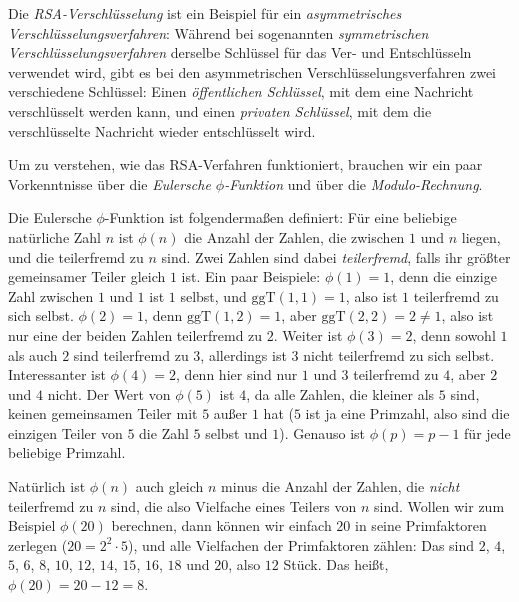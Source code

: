\documentclass{zusammenfassung}
\begin{document}

Die \emph{RSA-Verschlüsselung} ist ein Beispiel für ein \emph{asymmetrisches Verschlüsselungsverfahren}: Während bei sogenannten
\emph{symmetrischen Verschlüsselungsverfahren} derselbe Schlüssel für das Ver- und Entschlüsseln verwendet wird, gibt es bei den
asymmetrischen Verschlüsselungsverfahren zwei verschiedene Schlüssel: Einen \emph{öffentlichen Schlüssel}, mit dem eine Nachricht
verschlüsselt werden kann, und einen \emph{privaten Schlüssel}, mit dem die verschlüsselte Nachricht wieder entschlüsselt wird.

Um zu verstehen, wie das RSA-Verfahren funktioniert, brauchen wir ein paar Vorkenntnisse über die \emph{Eulersche $\phi$-Funktion}
und über die \emph{Modulo-Rechnung}.

Die Eulersche $\phi$-Funktion ist folgendermaßen definiert: Für eine beliebige natürliche Zahl $n$ ist $\phi(n)$ die Anzahl der
Zahlen, die zwischen $1$ und $n$ liegen, und die teilerfremd zu $n$ sind. Zwei Zahlen sind dabei \emph{teilerfremd}, falls ihr
größter gemeinsamer Teiler gleich $1$ ist. Ein paar Beispiele: $\phi(1)=1$, denn die einzige Zahl zwischen $1$ und $1$ ist $1$
selbst, und $\text{ggT}(1,1)=1$, also ist $1$ teilerfremd zu sich selbst. $\phi(2)=1$, denn $\text{ggT}(1,2)=1$, aber
$\text{ggT}(2,2)=2\neq 1$, also ist nur eine der beiden Zahlen teilerfremd zu $2$. Weiter ist $\phi(3)=2$, denn sowohl $1$ als
auch $2$ sind teilerfremd zu $3$, allerdings ist $3$ nicht teilerfremd zu sich selbst. Interessanter ist $\phi(4)=2$, denn hier
sind nur $1$ und $3$ teilerfremd zu $4$, aber $2$ und $4$ nicht. Der Wert von $\phi(5)$ ist $4$, da alle Zahlen, die kleiner als
$5$ sind, keinen gemeinsamen Teiler mit $5$ außer $1$ hat ($5$ ist ja eine Primzahl, also sind die einzigen Teiler von $5$ die
Zahl $5$ selbst und $1$). Genauso ist $\phi(p)=p-1$ für jede beliebige Primzahl.

Natürlich ist $\phi(n)$ auch gleich $n$ minus die Anzahl der Zahlen, die \emph{nicht} teilerfremd zu $n$ sind, die also Vielfache
eines Teilers von $n$ sind. Wollen wir zum Beispiel $\phi(20)$ berechnen, dann können wir einfach $20$ in seine Primfaktoren
zerlegen ($20=2^2\cdot 5$), und alle Vielfachen der Primfaktoren zählen: Das sind $2$, $4$, $5$, $6$, $8$, $10$, $12$, $14$, $15$,
$16$, $18$ und $20$, also $12$ Stück. Das heißt, $\phi(20)=20-12=8$.
\end{document}
